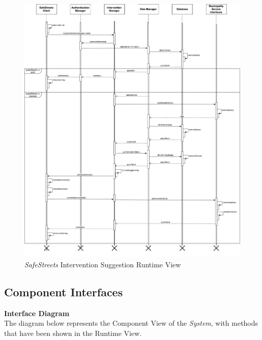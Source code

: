 \documentclass{article}
\begin{document}
	\begin{figure}[H]
			\centering
			\includegraphics[scale=0.25]{Images/Diagrams/Runtime/interventions_runtime.png}
			\caption{{\it SafeStreets} Intervention Suggestion Runtime View}
	\end{figure}
	\pagebreak
	\noindent
	\subsection{Component Interfaces}
	{\bf Interface Diagram} \\
	The diagram below represents the Component View of the {\it System}, with methods that have been shown in the Runtime View. 

	
\end{document}
